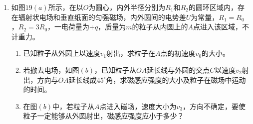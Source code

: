 \begin{enumerate}[leftmargin=0em]
{\begin{enumerate}
\begin{enumerate}
\end{enumerate}



\end{enumerate}
}


\newpage
\item
{}
如图$ 19(a) $所示，在以$ O $为圆心，内外半径分别为$ R_{1} $和$ R_{2} $的圆环区域内，存在辐射状电场和垂直纸面的匀强磁场，内外圆间的电势差$ U $为常量，$ R_{1}=R_{0} $，$ R_{2}=3R_{0} $，一电荷量为$ +q $，质量为$ m $的粒子从内圆上的$ A $点进入该区域，不计重力。
\begin{enumerate}
\renewcommand{\labelenumi}{\arabic{enumi}.}
\item
已知粒子从外圆上以速度$ v_{1} $射出，求粒子在$ A $点的初速度$ v_{0} $的大小。
\item 
若撤去电场，如图$ (b) $，已知粒子从$ OA $延长线与外圆的交点$ C $以速度$ v_{2} $射出，方向与$ OA $延长线成$ 45 ^{ \circ } $角，求磁感应强度的大小及粒子在磁场中运动的时间。
\item 
在图$ (b) $中，若粒子从$ A $点进入磁场，速度大小为$ v_{3} $，方向不确定，要使粒子一定能够从外圆射出，磁感应强度应小于多少？



\end{enumerate}
\begin{figure}[h!]
\flushright

\end{figure}


\end{enumerate}
